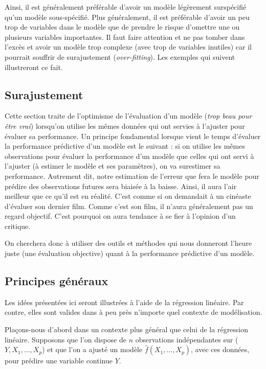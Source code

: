 \documentclass[
  11pt,
  letterpaper,
]{scrbook}
\theoremstyle{definition}
\theoremstyle{remark}
\begin{document}
Ainsi, il est généralement préférable d'avoir un modèle légèrement
surspécifié qu'un modèle sous-spécifié. Plus généralement, il est
préférable d'avoir un peu trop de variables dans le modèle que de
prendre le risque d'omettre une ou plusieurs variables importantes. Il
faut faire attention et ne pas tomber dans l'excès et avoir un modèle
trop complexe (avec trop de variables inutiles) car il pourrait souffrir
de surajustement (\emph{over-fitting}). Les exemples qui suivent
illustreront ce fait.

\hypertarget{surajustement}{%
\subsection{Surajustement}\label{surajustement}}

Cette section traite de l'optimisme de l'évaluation d'un modèle
(\emph{trop beau pour être vrai}) lorsqu'on utilise les mêmes données
qui ont servies à l'ajuster pour évaluer sa performance. Un principe
fondamental lorsque vient le temps d'évaluer la performance prédictive
d'un modèle est le suivant : si on utilise les mêmes observations pour
évaluer la performance d'un modèle que celles qui ont servi à l'ajuster
(à estimer le modèle et ses paramètres), on va surestimer sa
performance. Autrement dit, notre estimation de l'erreur que fera le
modèle pour prédire des observations futures sera biaisée à la baisse.
Ainsi, il aura l'air meilleur que ce qu'il est en réalité. C'est comme
si on demandait à un cinéaste d'évaluer son dernier film. Comme c'est
son film, il n'aura généralement pas un regard objectif. C'est pourquoi
on aura tendance à se fier à l'opinion d'un critique.

On cherchera donc à utiliser des outils et méthodes qui nous donneront
l'heure juste (une évaluation objective) quant à la performance
prédictive d'un modèle.

\hypertarget{principes-guxe9nuxe9raux}{%
\subsection{Principes généraux}\label{principes-guxe9nuxe9raux}}

Les idées présentées ici seront illustrées à l'aide de la régression
linéaire. Par contre, elles sont valides dans à peu près n'importe quel
contexte de modélisation.

Plaçons-nous d'abord dans un contexte plus général que celui de la
régression linéaire. Supposons que l'on dispose de \(n\) observations
indépendantes sur (\(Y, X_1, \ldots, X_p\)) et que l'on a ajusté un
modèle \(\widehat{f}(X_1, \ldots, X_p)\), avec ces données, pour prédire
une variable continue \(Y\).
\end{document}
